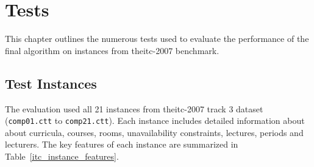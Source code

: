 \pretocmd{\chapter}{\glsresetall}{}{}


\chapter{Tests}


\label{Tests}

This chapter outlines the numerous tests used to evaluate the performance of the final algorithm on instances from the\ac{itc-2007} benchmark. %

\section{Test Instances}

The evaluation used all 21 instances from the\ac{itc-2007} track 3 dataset (\texttt{comp01.ctt} to \texttt{comp21.ctt}). Each instance includes detailed information about about curricula, courses, rooms, unavailability constraints, lectures, periods and lecturers. The key features of each instance are summarized in Table~\ref{itc_instance_features}.

